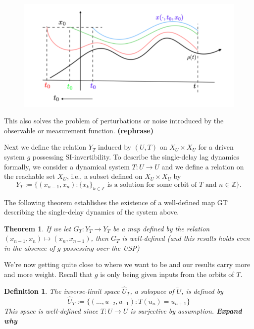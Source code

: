\documentclass[12 pt]{article}
\newtheorem{Definition}{Definition}[]
\newtheorem{Theorem}{Theorem}[]
\begin{document}
\begin{figure}[h]
  \includegraphics[scale=0.4]{memloss_conttime.png}
  \centering
  \label{fig:memoryLosscont_time}
\end{figure}

This also solves the problem of perturbations or noise introduced by the observable or measurement function. \textbf{(rephrase)}

Next we define the relation $Y_T$ induced by $(U,T)$ on $X_U\times{X_U}$ for a driven system $g$ possessing SI-invertibility.  To describe the  single-delay lag dynamics formally, we consider a dynamical system $T: U \to U$ and we define a relation on the reachable set $X_U$, i.e., a subset defined on $X_U \times X_U$ by 
$$Y_T:=\{(x_{n-1},x_n): \{x_k\}_{k\in \mathbb{Z}} \mbox{ is a solution for some orbit of } T \mbox{ and } n \in \mathbb{Z}\}.$$ 

The following theorem establishes the existence of a well-defined map GT describing the single-delay dynamics of the system above. 

\begin{Theorem}
If we let $G_T:Y_T\to{Y_T}$ be a map defined by the relation $(x_{n-1},x_n)\mapsto(x_n,x_{n-1})$, then $G_T$ is well-defined (and this results holds even in the absence of $g$ possessing over the USP)  
\end{Theorem}

We're now getting quite close to where we want to be and our results carry more and more weight. Recall that $g$ is only being given inputs from the orbits of $T$.  

\begin{Definition}
  The inverse-limit space $\widehat{U}_T$, a subspace of $\overleftarrow{U}$, is defined by $$\widehat{U}_T:=\{(\ldots, u_{-2}, u_{-1}):T(u_n)=u_{n+1}\}$$ This space is well-defined since $T:U\to{U}$ is surjective by assumption. \textbf{Expand why}
\end{Definition}
\end{document}

